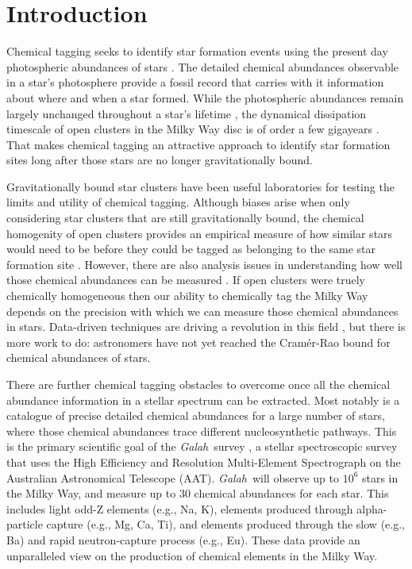 \documentclass[twocolumn]{aastex61}
\newcommand{\project}[1]{\textsl{#1}}
\newcommand{\Galah}{\project{Galah}}
\begin{document}

\section{Introduction} \label{sec:intro}

Chemical tagging seeks to identify star formation events using the present
day photospheric abundances of stars \citep{Freeman;Bland-Hawthorn:2002}.
The detailed chemical abundances observable in a star's photosphere provide a
fossil record that carries with it information about where and when a star
formed. While the photospheric abundances remain largely unchanged throughout
a star's lifetime \citep[however see][]{Dotter:2017,Ness:2018b}, the dynamical 
dissipation timescale of open clusters in the Milky Way disc is of order a few 
gigayears \citep{Portegies-Zwart:1998}. That makes chemical tagging an attractive 
approach to identify star formation sites long after those stars are no longer 
gravitationally bound.


Gravitationally bound star clusters have been useful laboratories for
testing the limits and utility of chemical tagging. Although biases arise when
only considering star clusters that are still gravitationally bound, the chemical
homogenity of open clusters provides an empirical measure of how similar stars
would need to be before they could be tagged as belonging to the same
star formation site \citep{Mitschang:2014}. However, there are also analysis
issues in understanding how well those chemical abundances can be measured
\citep{Bovy:2016}. If open clusters were truely chemically homogeneous then our
ability to chemically tag the Milky Way depends on the precision with which we
can measure those chemical abundances in stars. Data-driven techniques are
driving a revolution in this field \citep{Ness:2015,Ness:2018a,Ness:2018b,
Casey:2016,Casey:2017,Ho:2017b,Ho:2017a,Leung;Bovy:2018}, but there is more work
to do: astronomers have not yet reached the Cram\'er-Rao bound for chemical 
abundances of stars.


There are further chemical tagging obstacles to overcome once all the chemical 
abundance information in a stellar spectrum can be extracted. Most notably is a 
catalogue of precise detailed chemical abundances for a large number of stars,
where those chemical abundances trace different nucleosynthetic pathways.
This is the primary scientific goal of the \Galah\ survey \citep{DeSilva:2015,Martell:2017,Buder:2018},
a stellar spectroscopic survey that uses the High Efficiency and Resolution 
Multi-Element Spectrograph \citep[\project{HERMES};][]{Sheinis:2015} on the Australian 
Astronomical Telescope (AAT).  \Galah\ will observe up to $10^6$ stars in the 
Milky Way, and measure up to 30 chemical abundances for each star. This includes
light odd-Z elements (e.g., Na, K), elements produced through
alpha-particle capture (e.g., Mg, Ca, Ti), and elements produced
through the slow (e.g., Ba) and rapid neutron-capture process
(e.g., Eu). These data provide an unparalleled view on the production
of chemical elements in the Milky Way.
\end{document}
